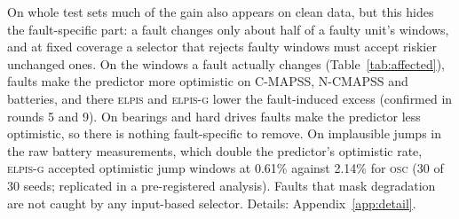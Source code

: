 \documentclass{esannV2}
\newcommand{\OSC}{\textsc{osc}}
\newcommand{\RPT}{\textsc{elpis}}
\newcommand{\AUTOD}{\textsc{elpis-g}}
\begin{document}
On whole test sets much of the gain also appears on clean data, but this hides the fault-specific part: a fault changes only about half of a faulty unit's windows, and at fixed coverage a selector that rejects faulty windows must accept riskier unchanged ones. On the windows a fault actually changes (Table~\ref{tab:affected}), faults make the predictor more optimistic on C-MAPSS, N-CMAPSS and batteries, and there \RPT{} and \AUTOD{} lower the fault-induced excess (confirmed in rounds 5 and 9). On bearings and hard drives faults make the predictor less optimistic, so there is nothing fault-specific to remove. On implausible jumps in the raw battery measurements, which double the predictor's optimistic rate, \AUTOD{} accepted optimistic jump windows at 0.61\% against 2.14\% for \OSC{} (30 of 30 seeds; replicated in a pre-registered analysis). Faults that mask degradation are not caught by any input-based selector. Details: Appendix~\ref{app:detail}.

\FloatBarrier
\end{document}
